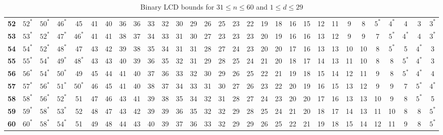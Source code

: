 \begin{sidewaystable}
\begin{tabular}{|c| c c c c c c c c c c c c c c c c c c c c c c c c c c c c c |}
\textbf{52} & $52^*$ & $50^*$ & $46^*$ & 45 & 41 & 40 & 36 & 36 & 33 & 32 & 30 & 29 & 26 & 25 & 23 & 22 & 19 & 18 & 16 & 15 & 12 & 11 & 9 & 8 & $5^*$ & $4^*$ & 4 & 3 & $3^*$ \\
\textbf{53} & $53^*$ & $52^*$ & $47^*$ & $46^*$ & 41 & 41 & 38 & 37 & 34 & 33 & 31 & 30 & 27 & 23 & 23 & 23 & 20 & 19 & 16 & 16 & 13 & 12 & 9 & 9 & 7 & $5^*$ & $4^*$ & 4 & $3^*$ \\
\textbf{54} & $54^*$ & $52^*$ & $48^*$ & 47 & 43 & 42 & 39 & 38 & 35 & 34 & 31 & 31 & 28 & 27 & 24 & 23 & 20 & 20 & 17 & 16 & 13 & 13 & 10 & 10 & 8 & $5^*$ & 5 & $4^*$ & 3 \\
\textbf{55} & $55^*$ & $54^*$ & $49^*$ & $48^*$ & 43 & 43 & 40 & 39 & 36 & 35 & 32 & 31 & 29 & 28 & 25 & 24 & 21 & 20 & 18 & 17 & 14 & 13 & 11 & 10 & 8 & 8 & $5^*$ & $4^*$ & 3 \\
\textbf{56} & $56^*$ & $54^*$ & $50^*$ & 49 & 45 & 44 & 41 & 40 & 37 & 36 & 33 & 32 & 30 & 29 & 26 & 25 & 22 & 21 & 19 & 18 & 15 & 14 & 12 & 11 & 9 & 8 & $5^*$ & $4^*$ & 4 \\
\textbf{57} & $57^*$ & $56^*$ & $51^*$ & $50^*$ & 46 & 45 & 41 & 40 & 38 & 37 & 34 & 33 & 31 & 30 & 27 & 26 & 23 & 22 & 20 & 19 & 16 & 15 & 13 & 12 & 9 & 9 & 7 & $5^*$ & $4^*$ \\
\textbf{58} & $58^*$ & $56^*$ & $52^*$ & 51 & 47 & 46 & 43 & 41 & 39 & 38 & 35 & 34 & 32 & 31 & 28 & 27 & 24 & 23 & 20 & 20 & 17 & 16 & 13 & 13 & 10 & 9 & 8 & $5^*$ & 5 \\
\textbf{59} & $59^*$ & $58^*$ & $53^*$ & 52 & 48 & 47 & 43 & 42 & 39 & 39 & 36 & 35 & 32 & 32 & 29 & 28 & 25 & 24 & 21 & 20 & 18 & 17 & 14 & 13 & 11 & 10 & 8 & 8 & $5^*$ \\
\textbf{60} & $60^*$ & $58^*$ & $54^*$ & 51 & 49 & 48 & 44 & 43 & 40 & 39 & 37 & 36 & 33 & 32 & 29 & 29 & 26 & 25 & 22 & 21 & 19 & 18 & 15 & 14 & 12 & 11 & 9 & 8 & $5^*$ \\
\hline
\end{tabular}
\caption{Binary LCD bounds for $31 \leq n \leq 60$ and $1 \leq d \leq 29$}
\label{tab:lp_tables_q2_31_60_1_29}
\end{sidewaystable}